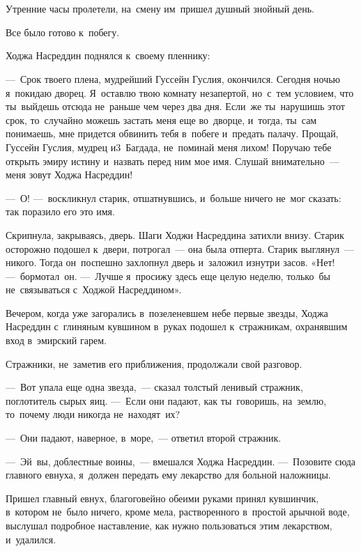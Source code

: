 \documentclass[12pt,a4paper]{book}
\begin{document}
\chapter{}

Утренние часы пролетели, на~смену им~пришел душный знойный день.

Все было готово к~побегу.

Ходжа Насреддин поднялся к~своему пленнику:

—~Срок твоего плена, мудрейший Гуссейн Гуслия, окончился. Сегодня ночью я~покидаю дворец. Я~оставлю твою комнату незапертой, но~с~тем условием, что ты~выйдешь отсюда не~раньше чем через два дня. Если~же ты~нарушишь этот срок, то~случайно можешь застать меня еще во~дворце, и~тогда, ты~сам понимаешь, мне придется обвинить тебя в~побеге и~предать палачу. Прощай, Гуссейн Гуслия, мудрец и3~Багдада, не~поминай меня лихом! Поручаю тебе открыть эмиру истину и~назвать перед ним мое имя. Слушай внимательно~— меня зовут Ходжа Насреддин!

—~О! —~воскликнул старик, отшатнувшись, и~больше ничего не~мог сказать: так поразило его это имя.

Скрипнула, закрываясь, дверь. Шаги Ходжи Насреддина затихли внизу. Старик осторожно подошел к~двери, потрогал~— она была отперта. Старик выглянул~— никого. Тогда он~поспешно захлопнул дверь и~заложил изнутри засов. «Нет! —~бормотал~он. —~Лучше я~просижу здесь еще целую неделю, только~бы не~связываться с~Ходжой Насреддином».

Вечером, когда уже загорались в~позеленевшем небе первые звезды, Ходжа Насреддин с~глиняным кувшином в~руках подошел к~стражникам, охранявшим вход в~эмирский гарем.

Стражники, не~заметив его приближения, продолжали свой разговор.

—~Вот упала еще одна звезда,~— сказал толстый ленивый стражник, поглотитель сырых яиц. —~Если они падают, как ты~говоришь, на~землю, то~почему люди никогда не~находят~их?

—~Они падают, наверное, в~море,~— ответил второй стражник.

—~Эй~вы, доблестные воины,~— вмешался Ходжа Насреддин. —~Позовите сюда главного евнуха, я~должен передать ему лекарство для больной наложницы.

Пришел главный евнух, благоговейно обеими руками принял кувшинчик, в~котором не~было ничего, кроме мела, растворенного в~простой арычной воде, выслушал подробное наставление, как нужно пользоваться этим лекарством, и~удалился.
\end{document}
